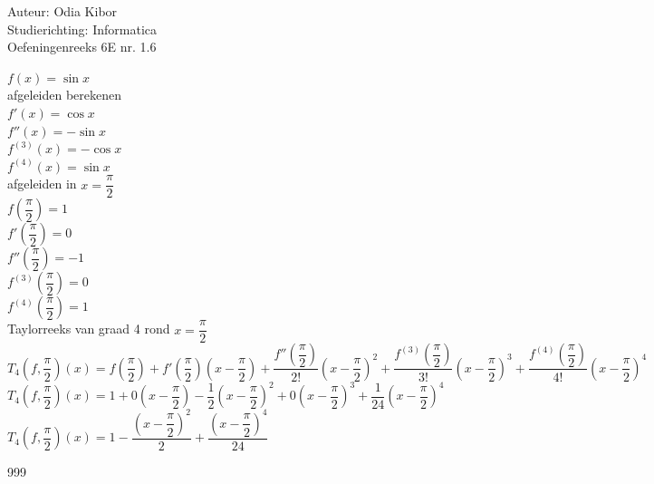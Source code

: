 \documentclass[a4paper]{article}
\begin{document}
  
\noindent \large Auteur: Odia Kibor \\
\noindent \large Studierichting: Informatica\\
\noindent \large Oefeningenreeks 6E nr. 1.6
\\

\medskip

\normalsize


$f(x) = \sin x$ \\

afgeleiden berekenen\\

$f'(x) = \cos x$ \\

$f''(x) = -\sin x$ \\

$f^{(3)}(x) = -\cos x$ \\

$f^{(4)}(x) = \sin x$ \\

afgeleiden in $x = \dfrac{\pi}{2}$\\

$f\left(\dfrac{\pi}{2}\right) = 1$ \\

$f'\left(\dfrac{\pi}{2}\right) = 0$ \\

$f''\left(\dfrac{\pi}{2}\right) = -1$ \\

$f^{(3)}\left(\dfrac{\pi}{2}\right) = 0$ \\

$f^{(4)}\left(\dfrac{\pi}{2}\right) = 1$ \\

Taylorreeks van graad 4 rond $x = \dfrac{\pi}{2}$\\

$T_4\left(f,\dfrac{\pi}{2}\right)(x) = f\left(\dfrac{\pi}{2}\right) + f'\left(\dfrac{\pi}{2}\right)\left(x-\dfrac{\pi}{2}\right) + \dfrac{f''\left(\dfrac{\pi}{2}\right)}{2!}\left(x-\dfrac{\pi}{2}\right)^2 + \dfrac{f^{(3)}\left(\dfrac{\pi}{2}\right)}{3!}\left(x-\dfrac{\pi}{2}\right)^3 + \dfrac{f^{(4)}\left(\dfrac{\pi}{2}\right)}{4!}\left(x-\dfrac{\pi}{2}\right)^4$ \\

$T_4\left(f,\dfrac{\pi}{2}\right)(x) = 1 + 0\left(x-\dfrac{\pi}{2}\right) - \dfrac{1}{2}\left(x-\dfrac{\pi}{2}\right)^2 + 0\left(x-\dfrac{\pi}{2}\right)^3 + \dfrac{1}{24}\left(x-\dfrac{\pi}{2}\right)^4$ \\

$T_4\left(f,\dfrac{\pi}{2}\right)(x) = 1 - \dfrac{\left(x-\dfrac{\pi}{2}\right)^2}{2} + \dfrac{\left(x-\dfrac{\pi}{2}\right)^4}{24}$ \\




















\begin{thebibliography}{999}
\end{thebibliography}
\end{document}
